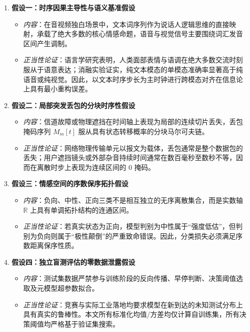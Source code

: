 \begin{enumerate}
    \item \textbf{假设一：时序因果主导性与语义基准假设}
    \begin{itemize}
        \item \textit{内容}：在音视频独白场景中，文本词序列作为说话人逻辑思维的直接映射，承载了绝大多数的核心情感命题，语音与视觉信号主要围绕词汇发音区间产生调制。
        \item \textit{正当性论证}：语言学研究表明，人类面部表情与语调在绝大多数交流时刻服从于语意表达；消融实验证实，纯文本模态的单模态准确率显著高于纯语音或纯视觉。因此，以文本时序步长为主时钟进行跨模态对齐在信息论上具有最小重构误差。
    \end{itemize}
    \item \textbf{假设二：局部突发丢包的分块时序性假设}
    \begin{itemize}
        \item \textit{内容}：信道故障或物理遮挡在时间轴上表现为局部的连续切片丢失，丢包掩码序列 $M_m[t]$ 服从具有状态转移概率的分块马尔可夫链。
        \item \textit{正当性论证}：网络物理传输单元以报文为载体，丢包通常是整个数据包的丢失；用户遮挡镜头或外部杂音持续时间通常在数百毫秒至数秒不等，因而在离散时步上表现为连续区间的 $0$ 掩码。
    \end{itemize}
    \item \textbf{假设三：情感空间的序数保序拓扑假设}
    \begin{itemize}
        \item \textit{内容}：负向、中性、正向三类不是相互独立的无序离散集合，而是实数轴 $\mathbb{R}$ 上具有单调拓扑结构的连通区间。
        \item \textit{正当性论证}：若真实状态为正向，模型判别为中性属于“强度低估”，但判别为负向则属于“极性颠倒”的严重致命错误。因此，分类损失必须满足序数距离保序性质。
    \end{itemize}
    \item \textbf{假设四：独立盲测评估的零数据泄露假设}
    \begin{itemize}
        \item \textit{内容}：测试集数据严禁参与训练阶段的反向传播、早停判断、决策阈值选取及元模型超参数拟合。
        \item \textit{正当性论证}：竞赛与实际工业落地均要求模型在新到达的未知测试分布上具有真实的鲁棒性。本文所有标准化均值/方差均仅计算自训练集，所有决策阈值均严格基于验证集搜索。
    \end{itemize}
\end{enumerate}

